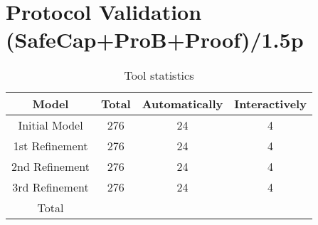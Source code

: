 \section{Protocol Validation (SafeCap+ProB+Proof)/1.5p}
\label{proof}

\begin{table}
	
	\centering
	\begin{tabular}{ c | c  | c | c  }
		
		Model & \hspace{.2cm} Total \hspace{.2cm} & \hspace{.2cm} Automatically \hspace{.2cm} & \hspace{.2cm} Interactively \hspace{.2cm}\\
		\hline
		Initial Model & 276   & 24   & 4 \\
		1st Refinement & 276  & 24   & 4 \\
		2nd Refinement & 276  & 24   & 4 \\
		3rd Refinement & 276  & 24   & 4 \\
		\hline
		Total & & &
	\end{tabular}
	\label{statistics}
	\caption{Tool statistics} 
\end{table}
